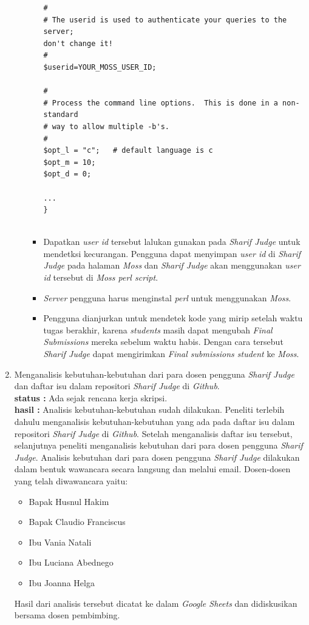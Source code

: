 \documentclass[a4paper,twoside]{article}
\begin{document}
\begin{enumerate}
\begin{enumerate}
\begin{itemize}
\begin{lstlisting}[backgroundcolor = \color{lightgray}]
#
# The userid is used to authenticate your queries to the server; 
don't change it!
#
$userid=YOUR_MOSS_USER_ID;

#
# Process the command line options.  This is done in a non-standard
# way to allow multiple -b's.
#
$opt_l = "c";   # default language is c
$opt_m = 10;
$opt_d = 0;

...				
}
				
				\end{lstlisting}
				
				\item Dapatkan \textit{user id} tersebut lalukan gunakan pada \textit{Sharif Judge} untuk mendetksi kecurangan. Pengguna dapat menyimpan \textit{user id} di \textit{Sharif Judge} pada halaman \textit{Moss} dan \textit{Sharif Judge} akan menggunakan \textit{user id} tersebut di \textit{Moss perl script}.
				
				\item \textit{Server} pengguna harus menginstal \textit{perl} untuk menggunakan \textit{Moss}.
				
				\item Pengguna dianjurkan untuk mendetek kode yang mirip setelah waktu tugas berakhir, karena \textit{students} masih dapat mengubah \textit{Final Submissions} mereka sebelum waktu habis. Dengan cara tersebut \textit{Sharif Judge} dapat mengirimkan \textit{Final submissions student} ke \textit{Moss}.
			\end{itemize}
		\end{enumerate}
				
		\item Menganalisis kebutuhan-kebutuhan dari para dosen pengguna \textit{Sharif Judge} dan daftar isu dalam repositori \textit{Sharif Judge} di \textit{Github}.\\
		{\bf status :} Ada sejak rencana kerja skripsi.\\
		{\bf hasil :} Analisis kebutuhan-kebutuhan sudah dilakukan. Peneliti terlebih dahulu menganalisis kebutuhan-kebutuhan yang ada pada daftar isu dalam repositori \textit{Sharif Judge} di \textit{Github}. Setelah menganalisis daftar isu tersebut, selanjutnya peneliti menganalisis kebutuhan dari para dosen pengguna \textit{Sharif Judge}. Analisis kebutuhan dari para dosen pengguna \textit{Sharif Judge} dilakukan dalam bentuk wawancara secara langsung dan melalui email. Dosen-dosen yang telah diwawancara yaitu:
		\begin{itemize}
			\item Bapak Husnul Hakim
			\item Bapak Claudio Franciscus
			\item Ibu Vania Natali
			\item Ibu Luciana Abednego
			\item Ibu Joanna Helga
		\end{itemize}
		Hasil dari analisis tersebut dicatat ke dalam \textit{Google Sheets} dan didiskusikan bersama dosen pembimbing.
		

\end{enumerate}
\end{document}
